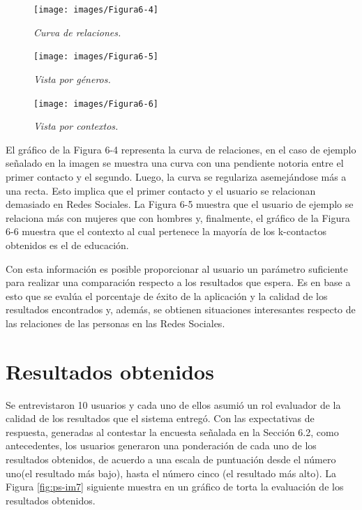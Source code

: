 \begin{figure}[H]
	\centering
	\texttt{[image: images/Figura6-4]}
	\caption{\em Curva de relaciones.}
	\label{fig:ps-im4}
\end{figure}

\begin{figure}[H]
	\centering
	\texttt{[image: images/Figura6-5]}
	\caption{\em Vista por géneros.}
	\label{fig:ps-im5}
\end{figure}

\begin{figure}[H]
	\centering
	\texttt{[image: images/Figura6-6]}
	\caption{\em Vista por contextos.}
	\label{fig:ps-im6}
\end{figure}

El gráfico de la Figura 6-4 representa la curva de relaciones, en el caso de ejemplo señalado en la imagen se muestra una curva con una pendiente notoria entre el primer contacto y el segundo. Luego, la curva se regulariza asemejándose más a una recta. Esto implica que el primer contacto y el usuario se relacionan demasiado en Redes Sociales. La Figura 6-5 muestra que el usuario de ejemplo se relaciona más con mujeres que con hombres y, finalmente, el gráfico de la Figura 6-6 muestra que el contexto al cual pertenece la mayoría de los k-contactos obtenidos es el de educación.

Con esta información es posible proporcionar al usuario un parámetro suficiente para realizar una comparación respecto a los resultados que espera. Es en base a esto que se evalúa el porcentaje de éxito de la aplicación y la calidad de los resultados encontrados y, además, se obtienen situaciones interesantes respecto de las relaciones de las personas en las Redes Sociales. 


\section{Resultados obtenidos}

Se entrevistaron 10 usuarios y cada uno de ellos asumió un rol evaluador de la calidad de los resultados que el sistema entregó. Con las expectativas de respuesta, generadas al contestar la encuesta señalada en la Sección 6.2, como antecedentes, los usuarios generaron una ponderación de cada uno de los resultados obtenidos, de acuerdo a una escala de puntuación desde el número uno(el resultado más bajo), hasta el número cinco (el resultado más alto).  La Figura \ref{fig:ps-im7} siguiente muestra en un gráfico de torta la evaluación de los resultados obtenidos.

